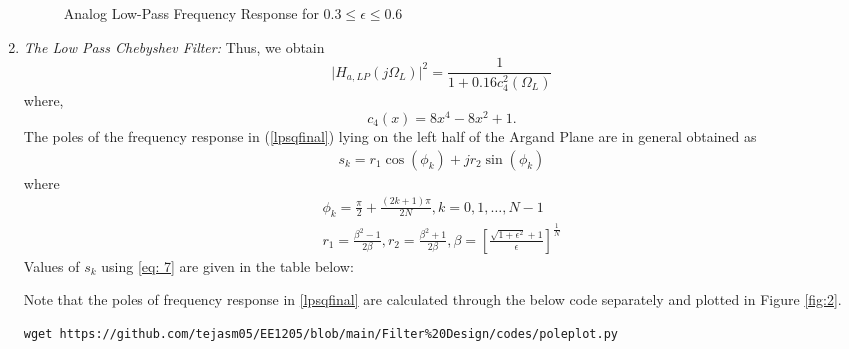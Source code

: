 \documentclass{article}
\begin{document}
\begin{enumerate}
\begin{figure}[!h]
    \caption{Analog Low-Pass Frequency Response for $0.3 \leq \epsilon \leq 0.6$}
    \label{fig:low_pass}
\end{figure}
\newpage
\item {\em The Low Pass Chebyshev Filter:} Thus, we obtain
\begin{equation}
\label{lpsqfinal}
\vert H_{a,LP}(j\Omega_L)\vert^2 = \frac{1}{1 + 0.16c_4^2(\Omega_L)}
\end{equation}
where,
\begin{equation}
c_4(x) = 8x^4 - 8x^2 + 1.	
\end{equation}
The poles of the frequency response in (\ref{lpsqfinal}) lying on the left half of the Argand Plane are in general obtained as
\begin{align}
    s_k = r_1\cos(\phi_k)+ jr_2\sin( \phi_k) \label{eq: 7}
\end{align}
where
\begin{eqnarray}
\label{lppoles}
\phi_k = \frac{\pi}{2} + \frac{(2k+1)\pi}{2N}, k = 0, 1, \dots, N-1 \nonumber \\
r_1 = \frac{\beta^2 - 1}{2\beta}, r_2 = \frac{\beta^2 + 1}{2\beta}, \beta = \left[ \frac{\sqrt{1 + \epsilon^2} + 1}{\epsilon}\right]^{\frac{1}{N}}
\end{eqnarray}
Values of $s_k$ using \eqref{eq: 7} are given in the table below:


Note that the poles of frequency response in \eqref{lpsqfinal} are calculated through the below code separately and plotted in Figure \ref{fig:2}.\\

\begin{lstlisting}[caption = {Code for Figure 2}]
wget https://github.com/tejasm05/EE1205/blob/main/Filter%20Design/codes/poleplot.py
\end{lstlisting}


\end{enumerate}
\end{document}

